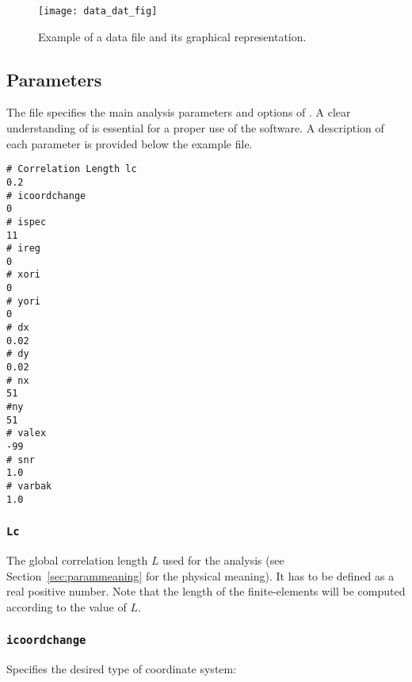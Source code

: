 \begin{figure}[H]
\centering
\texttt{[image: data\_dat\_fig]}
\caption{Example of a data file and its graphical representation.}
\end{figure}




\subsection{Parameters\label{sec:param.par}}

The file  specifies the main analysis parameters and options of \diva. A clear understanding of is essential for a proper use of the software. A description of each parameter is provided below the example file.

\begin{exfile}[htpb]
\begin{verbatim}
# Correlation Length lc
0.2
# icoordchange
0
# ispec
11
# ireg
0
# xori
0
# yori
0
# dx
0.02
# dy
0.02
# nx
51
#ny
51
# valex
-99
# snr
1.0
# varbak
1.0
\end{verbatim}
\caption{param.par\label{paramfile}}
\end{exfile}


\subsubsection{\texttt{Lc}}

The global correlation length $L$  used for the analysis (see Section~\ref{sec:parammeaning} for the physical meaning). It has to be defined as a real positive number. Note that the length of the finite-elements will be computed according to the value of $L$.

\subsubsection{\texttt{icoordchange}\label{sec:icoord}}


Specifies the desired type of coordinate system:\\

